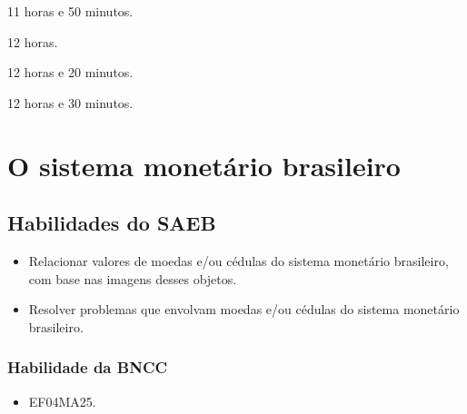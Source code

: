 \begin{multicols}{2}
\begin{escolha}
\item
  11 horas e 50 minutos.
\item
  12 horas.
\item
  12 horas e 20 minutos.
\item
  12 horas e 30 minutos.
\end{escolha}
\end{multicols}


\chapter{O sistema monetário brasileiro}

\vspace*{-1cm}

\section*{Habilidades do SAEB}\enlargethispage{4\baselineskip}

\begin{itemize}
\item Relacionar valores de moedas e/ou cédulas do sistema monetário
brasileiro, com base nas imagens desses objetos.

\item Resolver problemas que envolvam moedas e/ou cédulas do sistema
monetário brasileiro.
\end{itemize}

\subsection{Habilidade da BNCC}

\begin{itemize}
  \item EF04MA25.
\end{itemize}

